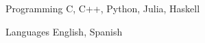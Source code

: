 


\begin{cvskills}


    \cvskill
    {Programming} %
    {C, C++, Python, Julia, Haskell} %






    \cvskill
    {Languages} %
    {English, Spanish} %


\end{cvskills}
